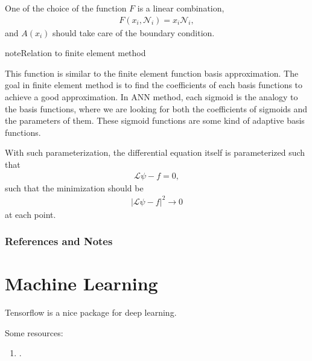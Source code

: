 \documentclass[letterpaper,12pt,english]{sphinxmanual}
\begin{document}
One of the choice of the function \(F\) is a linear combination,
\begin{equation*}
\begin{split}F(x_i, \mathcal N_i) = x_i \mathcal N_i,\end{split}
\end{equation*}
and \(A(x_i)\) should take care of the boundary condition.

\begin{sphinxadmonition}{note}{Relation to finite element method}

This function is similar to the finite element function basis approximation. The goal in finite element method is to find the coefficients of each basis functions to achieve a good approximation. In ANN method, each sigmoid is the analogy to the basis functions, where we are looking for both the coefficients of sigmoids and the parameters of them. These sigmoid functions are some kind of adaptive basis functions.
\end{sphinxadmonition}

With such parameterization, the differential equation itself is parameterized such that
\begin{equation*}
\begin{split}\mathcal L \psi - f = 0,\end{split}
\end{equation*}
such that the minimization should be
\begin{equation*}
\begin{split}\lvert \mathcal L \psi - f \rvert^2 \to 0\end{split}
\end{equation*}
at each point.


\subsection{References and Notes}
\label{\detokenize{artificial-neural-network/neural-net-and-fem:references-and-notes}}

\chapter{Machine Learning}
\label{\detokenize{machine-learning/index::doc}}\label{\detokenize{machine-learning/index:machine-learning}}
Tensorflow is a nice package for deep learning.

Some resources:
\begin{enumerate}
\item {} 
.

\end{enumerate}
\end{document}
